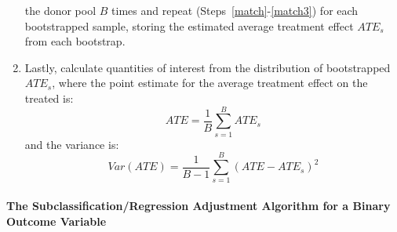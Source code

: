 \documentclass[11pt,titlepage]{article}
\begin{document}
\begin{enumerate}
  the donor pool $B$ times and repeat (Steps~\ref{match}-\ref{match3})
  for each bootstrapped sample, storing the estimated average
  treatment effect $ATE_s$ from each bootstrap.
\item Lastly, calculate quantities of interest from the distribution
  of bootstrapped $ATE_s$, where the point estimate for the average
  treatment effect on the treated is:
\begin{equation}
    ATE = \frac{1}{B} \sum_{s=1}^{B} ATE_s
\end{equation}
and the variance is:
\begin{equation}
    Var(ATE)= \frac{1}{B-1} \sum_{s=1}^{B} (ATE-ATE_s)^2
\end{equation}
\end{enumerate}

\paragraph{The Subclassification/Regression Adjustment Algorithm for a Binary Outcome
  Variable}
\end{document}
